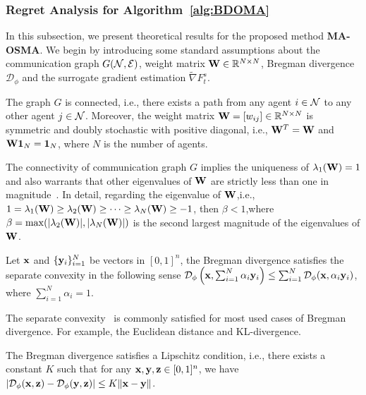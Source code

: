     \subsubsection{Regret Analysis for Algorithm~\ref{alg:BDOMA}}
     In this subsection, we present theoretical results for the proposed method \textbf{MA-OSMA}. 
    We begin by introducing some standard assumptions about the communication graph $G(\mathcal{N},\mathcal{E})$, weight matrix $\mathbf{W}\in\mathbb{R}^{N\times N}$,  Bregman divergence $\mathcal{D}_{\phi}$ and the surrogate gradient estimation $\tilde{\nabla}F_{t}^{s}$.
	\begin{assumption}\label{ass:1}
	The graph $G$ is connected, i.e., there exists a path from any agent $i\in\mathcal{N}$ to any other agent $j\in\mathcal{N}$. Moreover, the weight matrix $\mathbf{W}=[w_{ij}]\in\mathbb{R}^{N\times N}$ is symmetric and doubly 
	stochastic with positive diagonal, i.e., $\mathbf{W}^{T}=\mathbf{W}$ and $\mathbf{W}\mathbf{1}_{N}=\mathbf{1}_{N}$, where $N$ is the number of agents. 
\end{assumption}
\begin{remark}
	The connectivity of communication graph $G$ implies the uniqueness of $\lambda_{1}(\mathbf{W})=1$ and also warrants that other eigenvalues of $\mathbf{W}$ are strictly less than one in magnitude~\citep{nedic2009distributed,horn2012matrix,yuan2016convergence}. In detail, regarding the eigenvalue of $\mathbf{W}$,i.e., $1=\lambda_{1}(\mathbf{W})\ge\lambda_{2}(\mathbf{W})\ge\dots\ge\lambda_{N}(\mathbf{W})\ge-1$, then $\beta<1$,where $\beta=\max(|\lambda_{2}(\mathbf{W})|,|\lambda_{N}(\mathbf{W})|)$ is the second largest magnitude of the eigenvalues of $\mathbf{W}$.
\end{remark}
	\begin{assumption}\label{ass:3}
	Let $\mathbf{x}$ and $\{\mathbf{y}_{i}\}_{i=1}^{N}$ be vectors in $[0,1]^{n}$, the Bregman divergence satisfies the separate convexity in the following sense $\mathcal{D}_{\phi}\left(\mathbf{x},\sum_{i=1}^{N}\alpha_{i}\mathbf{y}_{i}\right)\le\sum_{i=1}^{N}\mathcal{D}_{\phi}(\mathbf{x},\alpha_{i}\mathbf{y}_{i})$, where $\sum_{i=1}^{N}\alpha_{i}=1$.
\end{assumption}
\begin{remark}
	The separate convexity~\citep{bauschke2001joint} is commonly satisfied for most used cases of Bregman divergence. For example, the Euclidean distance and KL-divergence.
\end{remark}
\begin{assumption}\label{ass:3+}
	The Bregman divergence satisfies a Lipschitz condition, i.e., there exists a constant $K$ such that for any $\mathbf{x},\mathbf{y},\mathbf{z}\in[0,1]^{n}$, we have $|\mathcal{D}_{\phi}(\mathbf{x},\mathbf{z})-\mathcal{D}_{\phi}(\mathbf{y},\mathbf{z})|\le K\|\mathbf{x}-\mathbf{y}\|$.
	\end{assumption}
